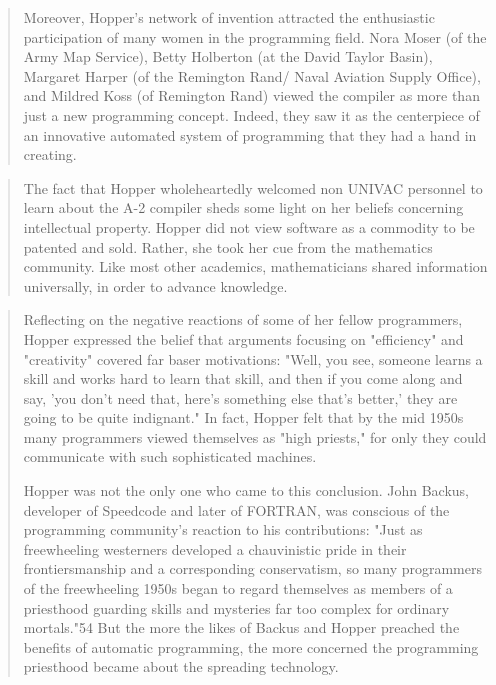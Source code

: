 \begin{quotation}
Moreover, Hopper's network of invention attracted the enthusiastic 
participation of many women in the programming field.  Nora Moser (of the Army 
Map Service), Betty Holberton (at the David Taylor Basin), Margaret Harper (of 
the Remington Rand/ Naval Aviation Supply Office), and Mildred Koss (of 
Remington Rand) viewed the compiler as more than just a new programming 
concept. Indeed, they saw it as the centerpiece of an innovative automated 
system of programming that they had a hand in creating.
\end{quotation}
\begin{quotation}
The fact that Hopper wholeheartedly welcomed non
UNIVAC personnel to learn about the A-2 compiler sheds some
light on her beliefs concerning intellectual property. Hopper did
not view software as a commodity to be patented and sold.
Rather, she took her cue from the mathematics community. Like
most other academics, mathematicians shared information universally, in order to advance knowledge.
\end{quotation}
\begin{quotation}
Reflecting on the negative reactions of some of her fellow
programmers, Hopper expressed the belief that arguments focusing on 
"efficiency" and "creativity" covered far baser motivations:
"Well, you see, someone learns a skill and works hard to learn
that skill, and then if you come along and say, 'you don't need
that, here's something else that's better,' they are going to be quite
indignant." In fact, Hopper felt that by the mid 1950s many
programmers viewed themselves as "high priests," for only they
could communicate with such sophisticated machines.

Hopper was not the only one who came to this conclusion.
John Backus, developer of Speedcode and later of FORTRAN,
was conscious of the programming community's reaction to his
contributions: "Just as freewheeling westerners developed a 
chauvinistic pride in their frontiersmanship and a corresponding
conservatism, so many programmers of the freewheeling 1950s began
to regard themselves as members of a priesthood guarding skills
and mysteries far too complex for ordinary mortals."54 But the
more the likes of Backus and Hopper preached the benefits of
automatic programming, the more concerned the programming
priesthood became about the spreading technology.
\end{quotation}


